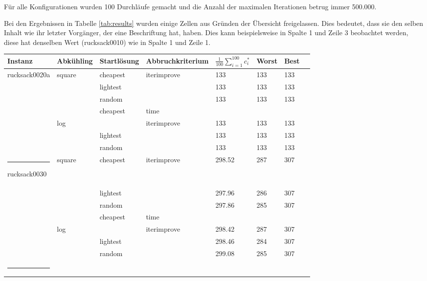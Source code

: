 \documentclass[11pt,a4paper]{article}
\makeatletter
\def\hlinewd#1{
  \noalign{\ifnum0=`}\fi\hrule \@height #1 \futurelet
  \reserved@a\@xhline
}
\makeatother
\begin{document}
Für alle Konfigurationen wurden 100 Durchläufe gemacht und die Anzahl der maximalen Iterationen betrug immer 500.000.

Bei den Ergebnissen in Tabelle \ref{tab:results} wurden einige Zellen aus Gründen der Übersicht freigelassen. Dies bedeutet, dass sie den selben Inhalt wie ihr letzter Vorgänger, der eine Beschriftung hat, haben. Dies kann beispielsweise in Spalte 1 und Zeile 3 beobachtet werden, diese hat denselben Wert (rucksack0010) wie in Spalte 1 und Zeile 1.

\clearpage

\begin{table}[!t]
  \centering
  \begin{tabular}{ | l | l | l | l | l | l | l | l | }
    \hline
        \textbf{Instanz} & \textbf{Abkühling} & \textbf{Startlösung} & \textbf{Abbruchkriterium} & \textbf{\(\frac{1}{100}\displaystyle\sum_{i=1}^{100} c_i^*\)} & \textbf{Worst} & \textbf{Best} \\ \hline
        rucksack0020a & square & cheapest & iterimprove & 133 & 133 & 133 \\ \hline
        &             & lightest & & 133 & 133 & 133 \\ \hline
        &             & random & & 133 & 133 & 133 \\ \hline
        &             & cheapest & time &  &  &  \\ \hline
        & log         & & iterimprove & 133 & 133 & 133 \\ \hline
        &             & lightest & & 133 & 133 & 133 \\ \hline
        &             & random & & 133 & 133 & 133 \\ \hlinewd{3pt}
        rucksack0030 & square & cheapest & iterimprove & 298.52 & 287 & 307 \\ \hline
        &            & lightest & & 297.96 & 286 & 307 \\ \hline
        &            & random & & \textcolor{BrickRed}{297.86} & 285 & 307 \\ \hline
        &            & cheapest & time &  &  &  \\ \hline
        & log        & & iterimprove & 298.42 & 287 & 307 \\ \hline
        &            & lightest & & 298.46 & 284 & 307 \\ \hline
        &            & random & & \textcolor{OliveGreen}{299.08} & 285 & 307 \\ \hlinewd{3pt}

\end{tabular}
\end{table}
\end{document}
